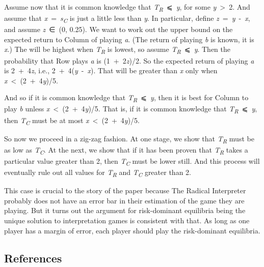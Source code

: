 \documentclass[
  10pt,
  letterpaper,
  DIV=11,
  numbers=noendperiod,
  twoside]{scrartcl}
\begin{document}
Assume now that it is common knowledge that
\emph{T\textsubscript{R}}~⩽~\emph{y}, for some \emph{y}~\textgreater~2.
And assume that \emph{x}~=~\emph{s\textsubscript{C}} is just a little
less than \emph{y}. In particular, define
\emph{z}~=~\emph{y}~-~\emph{x}, and assume \emph{z}~∈~(0, 0.25). We want
to work out the upper bound on the expected return to Column of playing
\emph{a}. (The return of playing \emph{b} is known, it is \emph{x}.) The
will be highest when \emph{T\textsubscript{R}} is lowest, so assume
\emph{T\textsubscript{R}}~⩽~\emph{y}. Then the probability that Row
plays \emph{a} is (1~+~2\emph{z})/2. So the expected return of playing
\emph{a} is 2~+~4\emph{z}, i.e., 2~+~4(\emph{y}~-~\emph{x}). That will
be greater than \emph{x} only when \emph{x}~\textless~(2~+~4\emph{y})/5.

And so if it is common knowledge that
\emph{T\textsubscript{R}}~⩽~\emph{y}, then it is best for Column to play
\emph{b} unless \emph{x}~\textless~(2~+~4\emph{y})/5. That is, if it is
common knowledge that \emph{T\textsubscript{R}}~⩽~\emph{y}, then
\emph{T\textsubscript{C}} must be at most
\emph{x}~\textless~(2~+~4\emph{y})/5.

So now we proceed in a zig-zag fashion. At one stage, we show that
\emph{T\textsubscript{R}} must be as low as \emph{T\textsubscript{C}}.
At the next, we show that if it has been proven that
\emph{T\textsubscript{R}} takes a particular value greater than 2, then
\emph{T\textsubscript{C}} must be lower still. And this process will
eventually rule out all values for \emph{T\textsubscript{R}} and
\emph{T\textsubscript{C}} greater than 2.

This case is crucial to the story of the paper because The Radical
Interpreter probably does not have an error bar in their estimation of
the game they are playing. But it turns out the argument for
risk-dominant equilibria being the unique solution to interpretation
games is consistent with that. As long as one player has a margin of
error, each player should play the risk-dominant equilibria.

\subsection*{References}\label{references}
\end{document}
